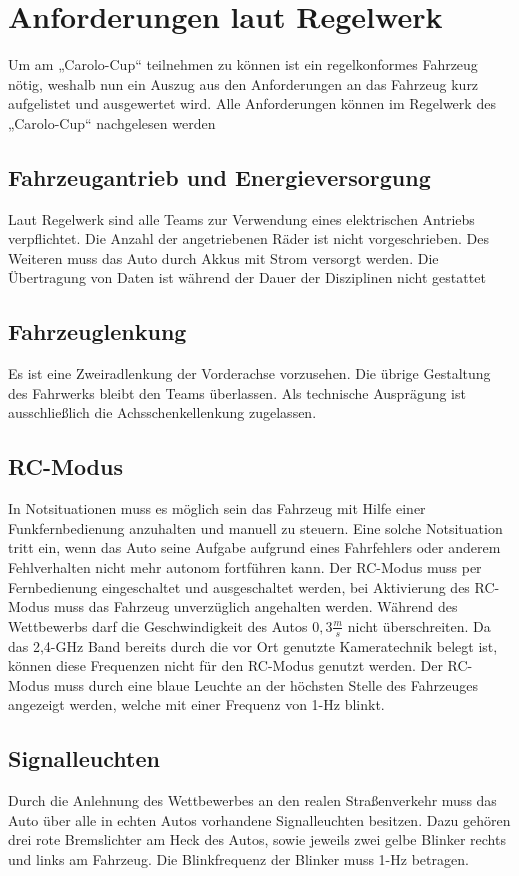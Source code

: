 \section{Anforderungen laut Regelwerk}
Um am „Carolo-Cup“ teilnehmen zu können ist ein regelkonformes Fahrzeug nötig, weshalb nun ein Auszug aus den Anforderungen an das Fahrzeug kurz 
aufgelistet und ausgewertet wird.
Alle Anforderungen können im Regelwerk des „Carolo-Cup“ nachgelesen werden \cite{website-carolo-cup-regelwerk}


\subsection{Fahrzeugantrieb und Energieversorgung}
Laut Regelwerk sind alle Teams zur Verwendung eines elektrischen Antriebs verpflichtet.
Die Anzahl der angetriebenen Räder ist nicht vorgeschrieben.
Des Weiteren muss das Auto durch Akkus mit Strom versorgt werden.
Die Übertragung von Daten ist während der Dauer der Disziplinen nicht gestattet

\subsection{Fahrzeuglenkung}
Es ist eine Zweiradlenkung der Vorderachse vorzusehen. Die übrige Gestaltung des Fahrwerks bleibt den Teams überlassen. Als
technische Ausprägung ist ausschließlich die Achsschenkellenkung zugelassen.

\subsection{RC-Modus}
In Notsituationen muss es möglich sein das Fahrzeug mit Hilfe einer Funkfernbedienung anzuhalten und manuell zu steuern. Eine solche Notsituation tritt ein, wenn
das Auto seine Aufgabe aufgrund eines Fahrfehlers oder anderem Fehlverhalten nicht mehr autonom fortführen kann.
Der RC-Modus muss per Fernbedienung eingeschaltet und ausgeschaltet werden, bei Aktivierung des RC-Modus muss das Fahrzeug unverzüglich angehalten werden.
Während des Wettbewerbs darf die Geschwindigkeit des Autos $0,3\frac{m}{s}$ nicht überschreiten.
Da das 2,4-GHz Band bereits durch die vor Ort genutzte Kameratechnik belegt ist, können diese Frequenzen nicht für den RC-Modus genutzt werden.
Der RC-Modus muss durch eine blaue Leuchte an der höchsten Stelle des Fahrzeuges angezeigt werden, welche mit einer Frequenz von 1-Hz blinkt.

\subsection{Signalleuchten}
Durch die Anlehnung des Wettbewerbes an den realen Straßenverkehr muss das Auto über alle in echten Autos vorhandene Signalleuchten besitzen. 
Dazu gehören drei rote Bremslichter am Heck des Autos, sowie jeweils zwei gelbe Blinker rechts und links am Fahrzeug. Die Blinkfrequenz der Blinker muss
1-Hz betragen.

